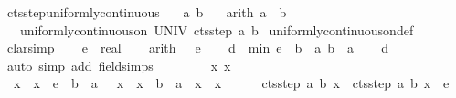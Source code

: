 \documentclass[leqno]{article}
\theoremstyle{definition}
\begin{document}
\begin{isabellebody}
\isamarkupfalse%
\ cts{\isacharunderscore}step{\isacharunderscore}uniformly{\isacharunderscore}continuous{\isacharcolon}\isanewline
\ \ \ a\ b\isanewline
\ \ \ {\isacharbrackleft}arith{\isacharbrackright}{\isacharcolon}\ {\isachardoublequoteopen}a\ {\isacharless}\ b{\isachardoublequoteclose}\isanewline
\ \ \ {\isachardoublequoteopen}uniformly{\isacharunderscore}continuous{\isacharunderscore}on\ UNIV\ {\isacharparenleft}cts{\isacharunderscore}step\ a\ b{\isacharparenright}{\isachardoublequoteclose}\isanewline
{}\isamarkupfalse%
\ uniformly{\isacharunderscore}continuous{\isacharunderscore}on{\isacharunderscore}def\ \isanewline
{}\isamarkupfalse%
\ {\isacharparenleft}clarsimp{\isacharparenright}\isanewline
\ \ \isamarkupfalse%
\ e\ {\isacharcolon}{\isacharcolon}\ real\isanewline
\ \ \isamarkupfalse%
\ {\isacharbrackleft}arith{\isacharbrackright}{\isacharcolon}\ {\isachardoublequoteopen}{}\ {\isacharless}\ e{\isachardoublequoteclose}\isanewline
\ \ \isamarkupfalse%
\ {\isacharquery}d\ {\isacharequal}\ {\isachardoublequoteopen}min\ {\isacharparenleft}e\ {\isacharasterisk}\ {\isacharparenleft}b\ {\isacharminus}\ a{\isacharparenright}{\isacharparenright}\ {\isacharparenleft}b\ {\isacharminus}\ a{\isacharparenright}{\isachardoublequoteclose}\isanewline
\ \ \isamarkupfalse%
\ {\isachardoublequoteopen}{\isacharquery}d\ {\isachargreater}\ {}{\isachardoublequoteclose}\ \isamarkupfalse%
\ {\isacharparenleft}auto\ simp\ add{\isacharcolon}\ field{\isacharunderscore}simps{\isacharparenright}\isanewline
\ \ \isacommand{{\isacharbraceleft}}\isamarkupfalse%
\isanewline
\ \ \ \ \isamarkupfalse%
\ x\ x{\isacharprime}\isanewline
\ \ \ \ \isamarkupfalse%
\ {}{\isacharcolon}\ {\isachardoublequoteopen}{\isasymbar}x{\isacharprime}\ {\isacharminus}\ x{\isasymbar}\ {\isacharless}\ e\ {\isacharasterisk}\ {\isacharparenleft}b\ {\isacharminus}\ a{\isacharparenright}{\isachardoublequoteclose}\ \ {}{\isacharcolon}\ {\isachardoublequoteopen}{\isasymbar}x{\isacharprime}\ {\isacharminus}\ x{\isasymbar}\ {\isacharless}\ b\ {\isacharminus}\ a{\isachardoublequoteclose}\ \ {\isachardoublequoteopen}x\ {\isasymle}\ x{\isacharprime}{\isachardoublequoteclose}\isanewline
\ \ \ \ \isamarkupfalse%
\ {\isachardoublequoteopen}{\isasymbar}cts{\isacharunderscore}step\ a\ b\ x{\isacharprime}\ {\isacharminus}\ cts{\isacharunderscore}step\ a\ b\ x{\isasymbar}\ {\isacharless}\ e{\isachardoublequoteclose}\isanewline

\end{isabellebody}
\end{document}
